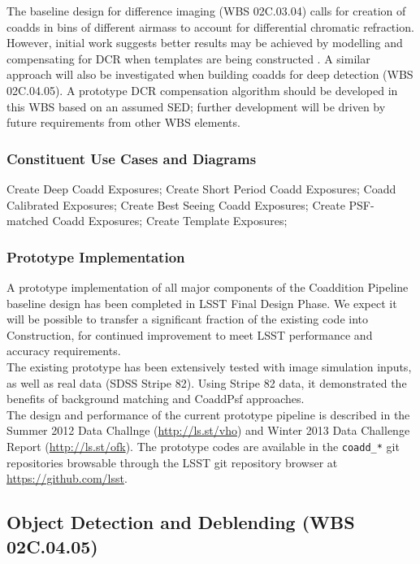 \documentclass[12pt]{article}
\newcommand{\wbsDiffim}{WBS 02C.03.04}
\newcommand{\wbsDetDeblend}{WBS 02C.04.05}
\begin{document}
The baseline design for difference imaging (\wbsDiffim) calls for creation of coadds in bins of different airmass to account for differential chromatic refraction. However, initial work suggests better results may be achieved by modelling and compensating for DCR when templates are being constructed \cite{Becker14}. A similar approach will also be investigated when building coadds for deep detection (\wbsDetDeblend). A prototype DCR compensation algorithm should be developed in this WBS based on an assumed SED; further development will be driven by future requirements from other WBS elements.

\subsubsection{Constituent Use Cases and Diagrams}

Create Deep Coadd Exposures; Create Short Period Coadd Exposures; Coadd Calibrated Exposures; Create Best Seeing Coadd Exposures; Create PSF-matched Coadd Exposures;
Create Template Exposures;

\subsubsection{Prototype Implementation}

A prototype implementation of all major components of the Coaddition Pipeline baseline design has been completed in LSST Final Design Phase. We expect it will be possible to transfer a significant fraction of the existing code into Construction, for continued improvement to meet LSST performance and accuracy requirements.
\\

The existing prototype has been extensively tested with image simulation inputs, as well as real data (SDSS Stripe 82). Using Stripe 82 data, it demonstrated the benefits of background matching and CoaddPsf approaches.
\\

The design and performance of the current prototype pipeline is described in the Summer 2012 Data Challnge (\url{http://ls.st/vho}) and Winter 2013 Data Challenge Report (\url{http://ls.st/ofk}). The prototype codes are available in the {\tt coadd\_*} git repositories browsable through the LSST git repository browser at \url{https://github.com/lsst}.

\clearpage

\subsection{Object Detection and Deblending (\wbsDetDeblend)}
\end{document}
